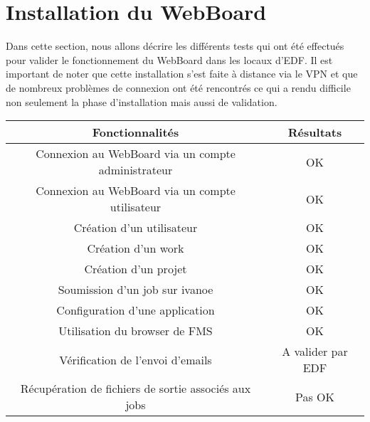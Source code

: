 \documentclass{article}
\begin{document}
\section{Installation du WebBoard}

Dans cette section, nous allons décrire les différents tests qui ont été effectués pour valider le fonctionnement du WebBoard dans 
les locaux d'EDF. Il est important de noter que cette installation s'est faite à distance via le VPN et que de nombreux problèmes de 
connexion ont été rencontrés ce qui a rendu difficile non seulement la phase d'installation mais aussi de validation.

\begin{tabular}{|c|c|}
\hline 
Fonctionnalités & Résultats \\
\hline 
Connexion au WebBoard via un compte administrateur & OK \\
\hline
Connexion au WebBoard via un compte utilisateur & OK \\
\hline
Création d'un utilisateur & OK \\
\hline
Création d'un work & OK \\
\hline
Création d'un projet & OK \\
\hline
Soumission d'un job sur ivanoe & OK \\
\hline
Configuration d'une application & OK \\
\hline
Utilisation du browser de FMS & OK \\
\hline
Vérification de l'envoi d'emails & A valider par EDF \\
\hline
Récupération de fichiers de sortie associés aux jobs & Pas OK \\
\hline
\end{tabular}


%
%
    
\end{document}
